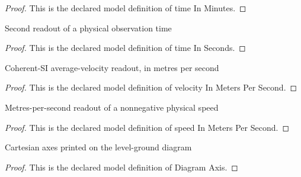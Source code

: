\begin{proof}
  This is the declared model definition of time In Minutes.
\end{proof}
\begin{definition}
  \label{def:physics:phyx-mini-0737:phyxminiproblems-problemphyxmini0737-timeinseconds}
  Second readout of a physical observation time
\end{definition}
\begin{proof}
  This is the declared model definition of time In Seconds.
\end{proof}
\begin{definition}
  \label{def:physics:phyx-mini-0737:phyxminiproblems-problemphyxmini0737-velocityinmeterspersecond}
  Coherent-SI average-velocity readout, in metres per second
\end{definition}
\begin{proof}
  This is the declared model definition of velocity In Meters Per Second.
\end{proof}
\begin{definition}
  \label{def:physics:phyx-mini-0737:phyxminiproblems-problemphyxmini0737-speedinmeterspersecond}
  Metres-per-second readout of a nonnegative physical speed
\end{definition}
\begin{proof}
  This is the declared model definition of speed In Meters Per Second.
\end{proof}
\begin{definition}
  \label{def:physics:phyx-mini-0737:phyxminiproblems-problemphyxmini0737-diagramaxis}
  Cartesian axes printed on the level-ground diagram
\end{definition}
\begin{proof}
  This is the declared model definition of Diagram Axis.
\end{proof}
